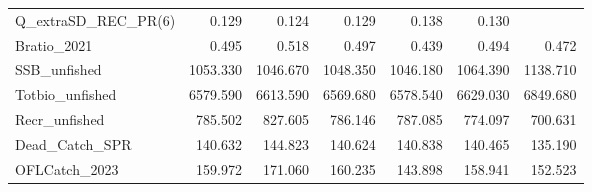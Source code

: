 \documentclass[
  english,
  a4paper,
]{article}
\begin{document}
\begin{landscape}
\begin{table}
\begin{tabular}[t]{lrrrrrr}
Q\_extraSD\_REC\_PR(6) & 0.129 & 0.124 & 0.129 & 0.138 & 0.130 & \\
Bratio\_2021 & 0.495 & 0.518 & 0.497 & 0.439 & 0.494 & 0.472\\
SSB\_unfished & 1053.330 & 1046.670 & 1048.350 & 1046.180 & 1064.390 & 1138.710\\
Totbio\_unfished & 6579.590 & 6613.590 & 6569.680 & 6578.540 & 6629.030 & 6849.680\\
Recr\_unfished & 785.502 & 827.605 & 786.146 & 787.085 & 774.097 & 700.631\\
Dead\_Catch\_SPR & 140.632 & 144.823 & 140.624 & 140.838 & 140.465 & 135.190\\
OFLCatch\_2023 & 159.972 & 171.060 & 160.235 & 143.898 & 158.941 & 152.523\\
\bottomrule
\end{tabular}
\end{table}
\end{landscape}
\end{document}
